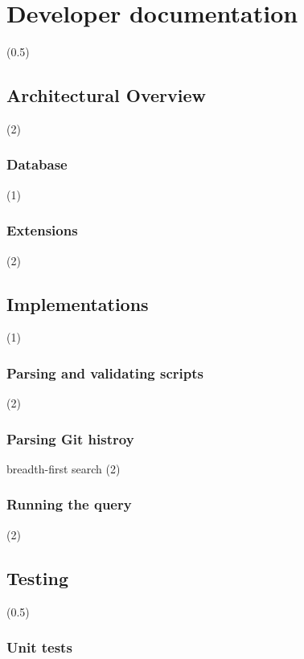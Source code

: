 \chapter{Developer documentation}
\label{ch:impl}

(0.5)

\section{Architectural Overview}

(2)

\subsection{Database}

(1)

\subsection{Extensions}

(2)

\section{Implementations}

(1)

\subsection{Parsing and validating scripts}

(2)

\subsection{Parsing Git histroy}

breadth-first search (2)

\subsection{Running the query}

(2)

\section{Testing}

(0.5)

\subsection{Unit tests}

